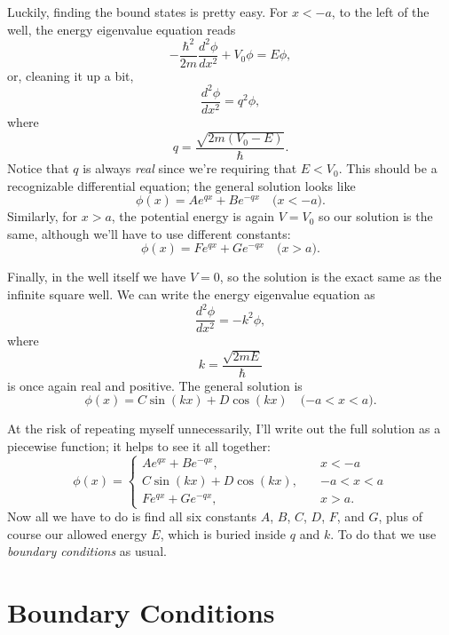 Luckily, finding the bound states is pretty easy.  For $x < -a$, to the left of the well, the energy eigenvalue equation reads
\[
-\frac{\hbar^2}{2m} \frac{d^2 \phi}{dx^2} + V_0 \phi = E\phi,
\]
or, cleaning it up a bit,
\begin{equation}
\frac{d^2\phi}{dx^2} = q^2 \phi,
\end{equation}
where
\begin{equation}
q = \frac{\sqrt{2m(V_0 - E)}}{\hbar}.
\end{equation}
Notice that $q$ is always \emph{real} since we're requiring that $E<V_0$.  This should be a recognizable differential equation; the general solution looks like
\begin{equation}
\phi(x) = A e^{qx} + B e^{-qx} \quad \text{($x<-a$)}.
\end{equation}
Similarly, for $x>a$, the potential energy is again $V = V_0$ so our solution is the same, although we'll have to use different constants:
\begin{equation}
\phi(x) = F e^{qx} + G e^{-qx} \quad \text{($x>a$)}.
\end{equation}

Finally, in the well itself we have $V = 0$, so the solution is the exact same as the infinite square well.  We can write the energy eigenvalue equation as
\begin{equation}
\frac{d^2\phi}{dx^2} = -k^2 \phi,
\end{equation}where
\begin{equation}
k = \frac{\sqrt{2mE}}{\hbar}
\end{equation}
is once again real and positive.  The general solution is 
\begin{equation}
\phi(x) = C \sin(kx) + D\cos(kx) \quad \text{($-a<x<a$)}.
\end{equation}

At the risk of repeating myself unnecessarily, I'll write out the full solution as a piecewise function; it helps to see it all together:
\begin{equation}
\phi(x) = \begin{cases}
A e^{qx} + B e^{-qx}, \quad & x<-a \\
C \sin(kx) + D\cos(kx) , \quad & -a<x<a \\
 F e^{qx} + G e^{-qx}, \quad & x>a.
\end{cases}
\end{equation}
Now all we have to do is find all six constants $A$, $B$, $C$, $D$, $F$, and $G$, plus of course our allowed energy $E$, which is buried inside $q$ and $k$.  To do that we use \emph{boundary conditions} as usual.

%
%
%

\section{Boundary Conditions}



